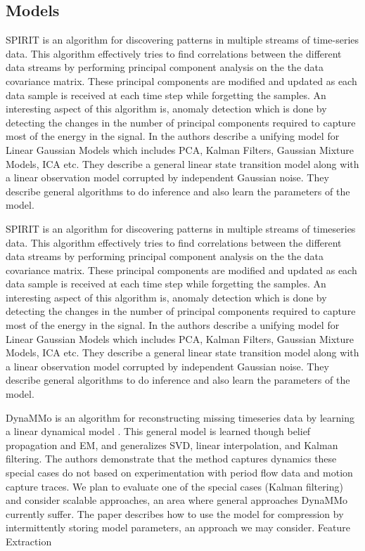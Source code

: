 \subsection{Models}

SPIRIT \cite{Papadimitriou2005} is an algorithm for discovering patterns in multiple streams of time-series data. This algorithm effectively tries to find correlations between the different data streams by performing principal component analysis on the the data covariance matrix. These principal components are modified and updated as each data sample is received at each time step while forgetting the samples. An interesting aspect of this algorithm is, anomaly detection which is done by detecting the changes in the number of principal components required to capture most of the energy in the signal.
In \cite{Roweis1999} the authors describe a unifying model for Linear Gaussian Models which includes PCA, Kalman Filters, Gaussian Mixture Models, ICA etc. They describe a general linear state transition model along with a linear observation model corrupted by independent Gaussian noise. They describe general algorithms to do inference and also learn the parameters of the model.

SPIRIT \cite{Papadimitriou2005} is an algorithm for discovering patterns in multiple streams of timeseries data. This algorithm effectively tries to find correlations between the different data streams by performing principal component analysis on the the data covariance matrix. These principal components are modified and updated as each data sample is received at each time step while forgetting the samples. An interesting aspect of this algorithm is, anomaly detection which is done by detecting the changes in the number of principal components required to capture most of the energy in the signal.
In \cite{Roweis1999} the authors describe a unifying model for Linear Gaussian Models which includes PCA, Kalman Filters, Gaussian Mixture Models, ICA etc. They describe a general linear state transition model along with a linear observation model corrupted by independent Gaussian noise. They describe general algorithms to do inference and also learn the parameters of the model.

DynaMMo is an algorithm for reconstructing missing timeseries data by learning a linear dynamical model \cite{Li2009}. This general model is learned though belief propagation and EM, and generalizes SVD, linear interpolation, and Kalman filtering. The authors demonstrate that the method captures dynamics these special cases do not based on experimentation with period flow data and motion capture traces. We plan to evaluate one of the special cases (Kalman filtering) and consider scalable approaches, an area where general approaches DynaMMo currently suffer. The paper describes how to use the model for compression by intermittently storing model parameters, an approach we may consider.
Feature Extraction

